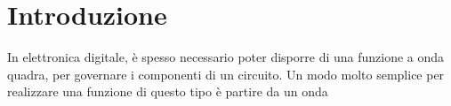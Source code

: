 \section{Introduzione}\label{sec:scopo}
In elettronica digitale, è spesso necessario poter disporre di una funzione
a onda quadra, per governare i componenti di un circuito.
Un modo molto semplice per realizzare una funzione di questo tipo è partire
da un onda
